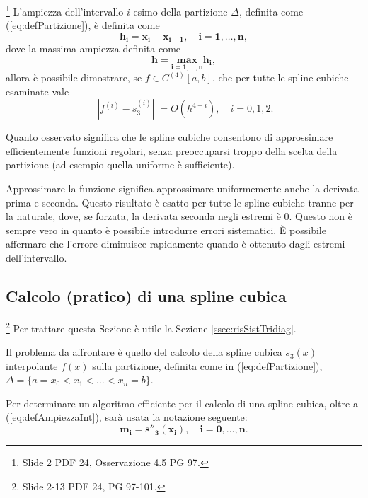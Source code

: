 \begin{remark}
    \footnote{Slide 2 PDF 24, Osservazione 4.5 PG 97.} L'ampiezza dell'intervallo $i$-esimo della partizione $\Delta$, definita come (\ref{eq:defPartizione}), è definita come
    \begin{equation}\label{eq:defAmpiezzaInt}
        \boldsymbol{h_i=x_i-x_{i-1},\quad i=1,\hdots,n},
    \end{equation}
    dove la massima ampiezza definita come 
    \begin{equation*}
        \boldsymbol{h=\underset{i=1,\hdots,n}{max}h_i},
    \end{equation*}
    allora è possibile dimostrare, se $f\in C^{(4)}[a,b]$, che per tutte le spline cubiche esaminate vale
    \begin{equation*}
        \left|\left|f^{(i)}-s^{(i)}_3\right|\right|=O\left(h^{4-i}\right),\quad i=0,1,2.
    \end{equation*}
\end{remark}

Quanto osservato significa che le spline cubiche consentono di approssimare efficientemente funzioni regolari, senza preoccuparsi troppo della scelta della partizione (ad esempio quella uniforme è sufficiente).

Approssimare la funzione significa approssimare uniformemente anche la derivata prima e seconda. Questo risultato è esatto per tutte le spline cubiche tranne per la naturale, dove, se forzata, la derivata seconda negli estremi è 0. Questo non è sempre vero in quanto è possibile introdurre errori sistematici. È possibile affermare che l'errore diminuisce rapidamente quando è ottenuto dagli estremi dell'intervallo.

\subsection{Calcolo (pratico) di una spline cubica}\label{ssec:calcSplineCub}\footnote{Slide 2-13 PDF 24, PG 97-101.}
Per trattare questa Sezione è utile la Sezione \ref{ssec:risSistTridiag}.

Il problema da affrontare è quello del calcolo della spline cubica $s_3(x)$ interpolante $f(x)$ sulla partizione, definita come in (\ref{eq:defPartizione}), $\Delta=\{a=x_0<x_1<\hdots<x_n=b\}$.

Per determinare un algoritmo efficiente per il calcolo di una spline cubica, oltre a (\ref{eq:defAmpiezzaInt}), sarà usata la notazione seguente:
\begin{equation}\label{eq:s''3(xi)}
    \boldsymbol{m_i=s''_3(x_i),\quad i=0,\hdots,n.}
\end{equation}

